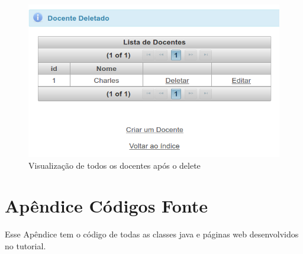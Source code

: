 \documentclass[12pt,a4paper]{article}
\begin{document}
\begin{figure}[H]
    \centering
    \includegraphics[scale=0.45]{delete.png}
    \caption{Visualização de todos os docentes após o delete}
    \label{delete}
\end{figure}

\newpage
\section{Apêndice Códigos Fonte}

Esse Apêndice tem o código de todas as classes java e páginas web desenvolvidos no tutorial.
\label{sectionCodigosFonte}
\end{document}
